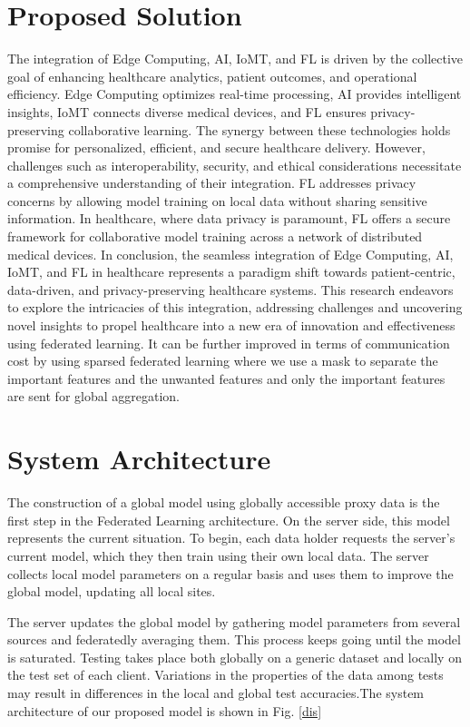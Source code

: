 \documentclass[conference]{IEEEtran}
\begin{document}
\section{Proposed Solution}
The integration of Edge Computing, AI, IoMT, and FL is driven by the collective goal of enhancing healthcare analytics, patient outcomes, and operational efficiency. Edge Computing optimizes real-time processing, AI provides intelligent insights, IoMT connects diverse medical devices, and FL ensures privacy-preserving collaborative learning. The synergy between these technologies holds promise for personalized, efficient, and secure healthcare delivery. However, challenges such as interoperability, security, and ethical considerations necessitate a comprehensive understanding of their integration. FL addresses privacy concerns by allowing model training on local data without sharing sensitive information. In healthcare, where data privacy is paramount, FL offers a secure framework for collaborative model training across a network of distributed medical devices. In conclusion, the seamless integration of Edge Computing, AI, IoMT, and FL in healthcare represents a paradigm shift towards patient-centric, data-driven, and privacy-preserving healthcare systems. This research endeavors to explore the intricacies of this integration, addressing challenges and uncovering novel insights to propel healthcare into a new era of innovation and effectiveness using federated learning. It can be further improved in terms of communication cost by using sparsed federated learning where we use a mask to separate the important features and the unwanted features and only the important features are sent for global aggregation.

\section{System Architecture}
The construction of a global model using globally accessible proxy data is the first step in the Federated Learning architecture. On the server side, this model represents the current situation. To begin, each data holder requests the server's current model, which they then train using their own local data. The server collects local model parameters on a regular basis and uses them to improve the global model, updating all local sites. 

The server updates the global model by gathering model parameters from several sources and federatedly averaging them. This process keeps going until the model is saturated. Testing takes place both globally on a generic dataset and locally on the test set of each client. Variations in the properties of the data among tests may result in differences in the local and global test accuracies.The system architecture of our proposed model is shown in Fig. \ref{dis}
\end{document}

